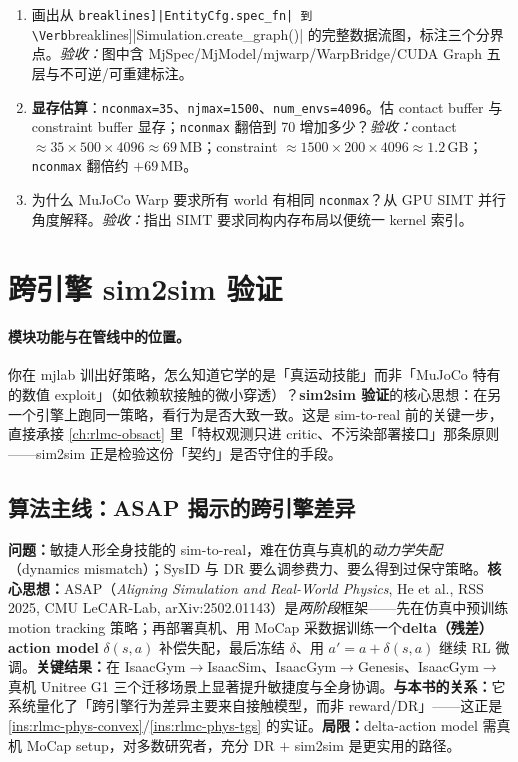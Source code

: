 \begin{practice}[本节练习]
\begin{enumerate}
  \item 画出从 \Verb[breaklines]|EntityCfg.spec_fn| 到 \Verb[breaklines]|Simulation.create_graph()| 的完整数据流图，标注三个分界点。\emph{验收：}图中含 MjSpec/MjModel/mjwarp/WarpBridge/CUDA Graph 五层与不可逆/可重建标注。
  \item \textbf{显存估算}：\verb|nconmax=35|、\verb|njmax=1500|、\verb|num_envs=4096|。估 contact buffer 与 constraint buffer 显存；\verb|nconmax| 翻倍到 70 增加多少？\emph{验收：}contact $\approx35\times500\times4096\approx69$\,MB；constraint $\approx1500\times200\times4096\approx1.2$\,GB；\verb|nconmax| 翻倍约 $+69$\,MB。
  \item 为什么 MuJoCo Warp 要求所有 world 有相同 \verb|nconmax|？从 GPU SIMT 并行角度解释。\emph{验收：}指出 SIMT 要求同构内存布局以便统一 kernel 索引。
\end{enumerate}
\end{practice}

\section{跨引擎 sim2sim 验证}
\label{sec:rlmc-phys-sim2sim}

\paragraph{模块功能与在管线中的位置。}你在 mjlab 训出好策略，怎么知道它学的是「真运动技能」而非「MuJoCo 特有的数值 exploit」（如依赖软接触的微小穿透）？\textbf{sim2sim 验证}的核心思想：在另一个引擎上跑同一策略，看行为是否大致一致。这是 sim-to-real 前的关键一步，直接承接 \cref{ch:rlmc-obsact} 里「特权观测只进 critic、不污染部署接口」那条原则——sim2sim 正是检验这份「契约」是否守住的手段。

\subsection{算法主线：ASAP 揭示的跨引擎差异}

\begin{paper}\label{paper:rlmc-phys-asap}
\textbf{问题：}敏捷人形全身技能的 sim-to-real，难在仿真与真机的\emph{动力学失配}（dynamics mismatch）；SysID 与 DR 要么调参费力、要么得到过保守策略。\textbf{核心思想：}ASAP（\emph{Aligning Simulation and Real-World Physics}, He et al., RSS 2025, CMU LeCAR-Lab, arXiv:2502.01143）\cite{asap2025}是\emph{两阶段}框架——先在仿真中预训练 motion tracking 策略；再部署真机、用 MoCap 采数据训练一个\textbf{delta（残差）action model} $\delta(s,a)$ 补偿失配，最后冻结 $\delta$、用 $a'=a+\delta(s,a)$ 继续 RL 微调。\textbf{关键结果：}在 IsaacGym$\to$IsaacSim、IsaacGym$\to$Genesis、IsaacGym$\to$真机 Unitree G1 三个迁移场景上显著提升敏捷度与全身协调。\textbf{与本书的关系：}它系统量化了「跨引擎行为差异主要来自接触模型，而非 reward/DR」——这正是 \cref{ins:rlmc-phys-convex}/\cref{ins:rlmc-phys-tgs} 的实证。\textbf{局限：}delta-action model 需真机 MoCap setup，对多数研究者，充分 DR $+$ sim2sim 是更实用的路径。
\end{paper}

